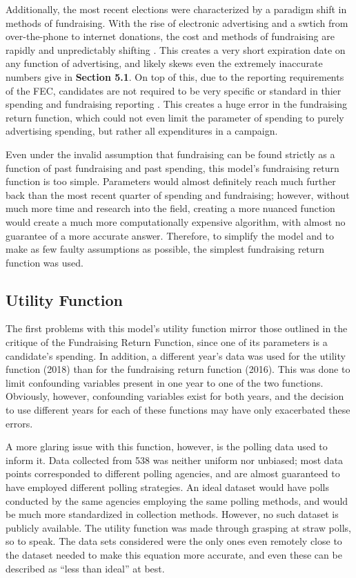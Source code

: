 \documentclass[11pt]{article}
\begin{document}
Additionally, the most recent elections were characterized by a paradigm
shift in methods of fundraising. With the rise of electronic advertising
and a swtich from over-the-phone to internet donations, the cost and
methods of fundraising are rapidly and unpredictably shifting
\cite{fundresearch1}. This creates a very short expiration date on any
function of advertising, and likely skews even the extremely inaccurate
numbers give in \textbf{Section 5.1}. On top of this, due to the reporting
requirements of the FEC, candidates are not required to be very specific or
standard in thier spending and fundraising reporting \cite{fecform}. This
creates a huge error in the fundraising return function, which could not
even limit the parameter of spending to purely advertising spending, but
rather all expenditures in a campaign.

Even under the invalid assumption that fundraising can be found strictly as
a function of past fundraising and past spending, this model's fundraising
return function is too simple. Parameters would almost definitely reach
much further back than the most recent quarter of spending and fundraising;
however, without much more time and research into the field, creating a
more nuanced function would create a much more computationally expensive
algorithm, with almost no guarantee of a more accurate answer. Therefore,
to simplify the model and to make as few faulty assumptions as possible,
the simplest fundraising return function was used.

\subsection{Utility Function}
The first problems with this model's utility function mirror those outlined
in the critique of the Fundraising Return Function, since one of its
parameters is a candidate's spending. In addition, a different year's data
was used for the utility function (2018) than for the fundraising return
function (2016). This was done to limit confounding variables present in
one year to one of the two functions. Obviously, however, confounding
variables exist for both years, and the decision to use different years for
each of these functions may have only exacerbated these errors.

A more glaring issue with this function, however, is the polling data used
to inform it. Data collected from 538 was neither uniform nor unbiased;
most data points corresponded to different polling agencies, and are almost
guaranteed to have employed different polling strategies. An ideal dataset
would have polls conducted by the same agencies employing the same polling
methods, and would be much more standardized in collection
methods. However, no such dataset is publicly available. The utility
function was made through grasping at straw polls, so to speak. The data
sets considered were the only ones even remotely close to the dataset
needed to make this equation more accurate, and even these can be described
as ``less than ideal'' at best.
\end{document}
